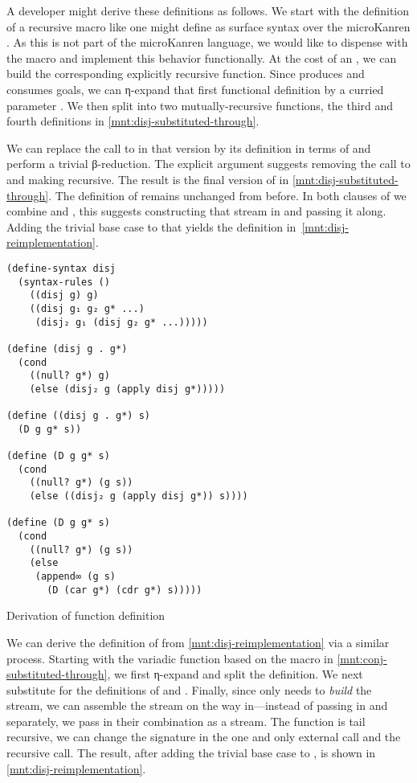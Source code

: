 \documentclass[sigplan,balance=true,pbalance=true,natbib=false]{acmart}
\begin{document}
A developer might derive these definitions as follows. We start with
the definition of a recursive  macro like one might
define as surface syntax over the microKanren . As
this is not part of the microKanren language, we would like to
dispense with the macro and implement this behavior functionally. At
the cost of an , we can build the corresponding
explicitly recursive  function.
Since  produces and consumes goals, we can η-expand
that first functional definition by a curried
parameter . We then split  into two
mutually-recursive functions, the third and fourth definitions in
\cref{mnt:disj-substituted-through}.

We can replace the call to  in that version by its
definition in terms of  and perform a trivial
β-reduction. The explicit  argument suggests removing
the call to  and making  recursive.
The result is the final version of  in
\cref{mnt:disj-substituted-through}. The definition
of  remains unchanged from before. In both clauses
of  we combine  and , this
suggests constructing that stream in  and passing it
along. Adding the trivial base case to that  yields
the definition in~\cref{mnt:disj-reimplementation}.

\begin{listing}
\begin{verbatim}
(define-syntax disj
  (syntax-rules ()
    ((disj g) g)
    ((disj g₁ g₂ g* ...)
     (disj₂ g₁ (disj g₂ g* ...)))))

(define (disj g . g*)
  (cond
    ((null? g*) g)
    (else (disj₂ g (apply disj g*)))))

(define ((disj g . g*) s)
  (D g g* s))

(define (D g g* s)
  (cond
    ((null? g*) (g s))
    (else ((disj₂ g (apply disj g*)) s))))

(define (D g g* s)
  (cond
    ((null? g*) (g s))
    (else
     (append∞ (g s)
       (D (car g*) (cdr g*) s)))))
\end{verbatim}
  \caption{Derivation of  function definition}\label{mnt:disj-substituted-through}
\end{listing}

We can derive the definition of  from
\cref{mnt:disj-reimplementation} via a similar process. Starting with
the variadic function based on the macro in
\cref{mnt:conj-substituted-through}, we first η-expand and split the
definition. We next substitute for the definitions
of  and . Finally,
since  only needs  to \emph{build} the
stream, we can assemble the stream on the way in---instead of passing
in  and  separately, we pass in their
combination as a stream. The function is tail recursive, we can change
the signature in the one and only external call and the recursive
call. The result, after adding the trivial base case
to , is shown in \cref{mnt:disj-reimplementation}.
\end{document}
